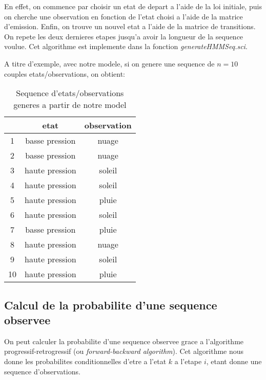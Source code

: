 \documentclass{article}
\begin{document}
\begin{multicols}{2}
En effet, on commence par choisir un etat de depart a l'aide de la loi initiale,
puis on cherche une observation en fonction de l'etat choisi a l'aide de la
matrice d'emission. Enfin, on trouve un nouvel etat a l'aide de la matrice de
transitions. On repete les deux dernieres etapes jusqu'a avoir la longueur de la
sequence voulue. Cet algorithme est implemente dans la fonction
\emph{generateHMMSeq.sci}.

A titre d'exemple, avec notre modele, si on genere une sequence de $n = 10$
couples etats/observations, on obtient:

\begin{table}[H]
    \begin{center}
        \centering
        \captionsetup{justification=centering}
        \caption{\label{tab:hmmSeq}Sequence d'etats/observations generes a partir de notre model}
        \begin{tabular}{|c|c|c|}
            \hline
            & etat & observation \\
            \hline
            1 & basse pression & nuage \\
            2 & basse pression & nuage \\
            3 & haute pression & soleil \\
            4 & haute pression & soleil \\
            5 & haute pression & pluie \\
            6 & haute pression & soleil \\
            7 & basse pression & pluie \\
            8 & haute pression & nuage \\
            9 & haute pression & soleil \\
            10 & haute pression & pluie \\
            \hline
        \end{tabular}
    \end{center}
\end{table}

\subsection{Calcul de la probabilite d'une sequence observee}

On peut calculer la probabilite d'une sequence observee grace a l'algorithme
progressif-retrogressif (ou \emph{forward-backward algorithm}). Cet algorithme
nous donne les probabilites conditionnelles d'etre a l'etat $k$ a l'etape $i$,
etant donne une sequence d'observations.


\end{multicols}
\end{document}
